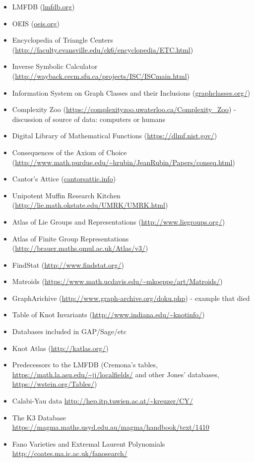 \documentclass{article}
\begin{document}
\begin{itemize}
\item LMFDB (\url{lmfdb.org})
\item OEIS (\url{oeis.org})
\item Encyclopedia of Triangle Centers (\url{http://faculty.evansville.edu/ck6/encyclopedia/ETC.html})
\item Inverse Symbolic Calculator (\url{http://wayback.cecm.sfu.ca/projects/ISC/ISCmain.html})
\item Information System on Graph Classes and their Inclusions (\url{graphclasses.org/})
\item Complexity Zoo (\url{https://complexityzoo.uwaterloo.ca/Complexity_Zoo}) - discussion of source of data: computers or humans
\item Digital Library of Mathematical Functions (\url{https://dlmf.nist.gov/})
\item Consequences of the Axiom of Choice (\url{http://www.math.purdue.edu/~hrubin/JeanRubin/Papers/conseq.html})
\item Cantor's Attice (\url{cantorsattic.info})
\item Unipotent Muffin Research Kitchen (\url{http://lie.math.okstate.edu/UMRK/UMRK.html})
\item Atlas of Lie Groups and Representations (\url{http://www.liegroups.org/})
\item Atlas of Finite Group Representations (\url{http://brauer.maths.qmul.ac.uk/Atlas/v3/})
\item FindStat (\url{http://www.findstat.org/})
\item Matroids (\url{https://www.math.ucdavis.edu/~mkoeppe/art/Matroids/})
\item GraphArichive (\url{http://www.graph-archive.org/doku.php}) - example that died
\item Table of Knot Invariants (\url{http://www.indiana.edu/~knotinfo/})
\item Databases included in GAP/Sage/etc
\item Knot Atlas (\url{http://katlas.org/})
\item Predecessors to the LMFDB (Cremona's tables, \url{https://math.la.asu.edu/~jj/localfields/} and other Jones' databases, \url{https://wstein.org/Tables/})
\item Calabi-Yau data \url{http://hep.itp.tuwien.ac.at/~kreuzer/CY/}
\item The K3 Database \url{https://magma.maths.usyd.edu.au/magma/handbook/text/1410}
\item Fano Varieties and Extremal Laurent Polynomials \url{http://coates.ma.ic.ac.uk/fanosearch/}
\end{itemize}
\end{document}
